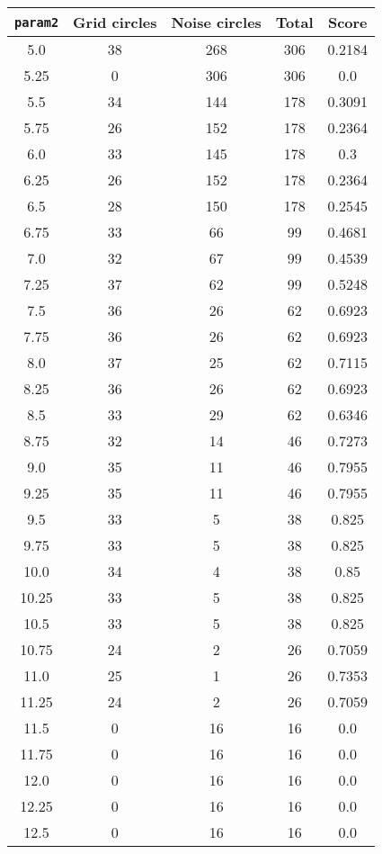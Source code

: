 \documentclass[letterpaper, 12pt]{article}
\begin{document}
\begin{longtable}{|c|c|c|c|c|}
\hline
\textbf{\texttt{param2}} & \textbf{Grid circles} & \textbf{Noise circles} & \textbf{Total} & \textbf{Score} \\
\hline
5.0 & 38 & 268 & 306 & 0.2184 \\
\hline
5.25 & 0 & 306 & 306 & 0.0 \\
\hline
5.5 & 34 & 144 & 178 & 0.3091 \\
\hline
5.75 & 26 & 152 & 178 & 0.2364 \\
\hline
6.0 & 33 & 145 & 178 & 0.3 \\
\hline
6.25 & 26 & 152 & 178 & 0.2364 \\
\hline
6.5 & 28 & 150 & 178 & 0.2545 \\
\hline
6.75 & 33 & 66 & 99 & 0.4681 \\
\hline
7.0 & 32 & 67 & 99 & 0.4539 \\
\hline
7.25 & 37 & 62 & 99 & 0.5248 \\
\hline
7.5 & 36 & 26 & 62 & 0.6923 \\
\hline
7.75 & 36 & 26 & 62 & 0.6923 \\
\hline
8.0 & 37 & 25 & 62 & 0.7115 \\
\hline
8.25 & 36 & 26 & 62 & 0.6923 \\
\hline
8.5 & 33 & 29 & 62 & 0.6346 \\
\hline
8.75 & 32 & 14 & 46 & 0.7273 \\
\hline
9.0 & 35 & 11 & 46 & 0.7955 \\
\hline
9.25 & 35 & 11 & 46 & 0.7955 \\
\hline
9.5 & 33 & 5 & 38 & 0.825 \\
\hline
9.75 & 33 & 5 & 38 & 0.825 \\
\hline
10.0 & 34 & 4 & 38 & 0.85 \\
\hline
10.25 & 33 & 5 & 38 & 0.825 \\
\hline
10.5 & 33 & 5 & 38 & 0.825 \\
\hline
10.75 & 24 & 2 & 26 & 0.7059 \\
\hline
11.0 & 25 & 1 & 26 & 0.7353 \\
\hline
11.25 & 24 & 2 & 26 & 0.7059 \\
\hline
11.5 & 0 & 16 & 16 & 0.0 \\
\hline
11.75 & 0 & 16 & 16 & 0.0 \\
\hline
12.0 & 0 & 16 & 16 & 0.0 \\
\hline
12.25 & 0 & 16 & 16 & 0.0 \\
\hline
12.5 & 0 & 16 & 16 & 0.0 \\

\end{longtable}
\end{document}
